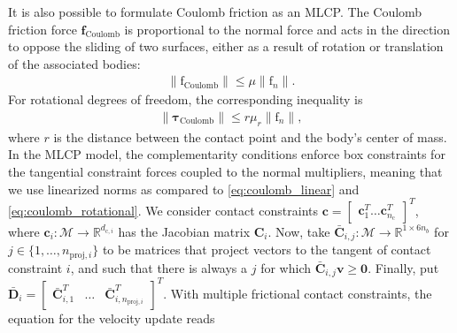 \documentclass[preprint,12pt]{elsarticle}
\let\vec\bm
\let\mat\mathbf
\numberwithin{equation}{section}
\def\tc{\text{c}}
\begin{document}
It is also possible to formulate Coulomb friction as an MLCP.
The Coulomb friction force $\vec{\mathrm{\vec{f}}}_{\text{Coulomb}}$ is proportional to the normal force and acts in the direction to oppose the sliding of two surfaces, either as a result of rotation or translation of the associated bodies:
\begin{align}
\label{eq:coulomb_linear}
    \| \vec{\mathrm{f}}_{\text{Coulomb}}\| \leq \mu\|\vec{\mathrm{f}}_n\|.
\end{align}
For rotational degrees of freedom, the corresponding inequality is
\begin{align}
    \label{eq:coulomb_rotational}
    \| \vec{\tau}_{\text{Coulomb}}\| \leq r \mu_r\|\vec{\mathrm{f}}_n\|,
\end{align}
where $r$ is the distance between the contact point and the body's center of mass.
In the MLCP model, the complementarity conditions enforce box constraints for the tangential constraint forces coupled to the normal multipliers, meaning that we use linearized norms as compared to \eqref{eq:coulomb_linear} and \eqref{eq:coulomb_rotational}.
We consider contact constraints $\vec{c} = \begin{bmatrix} \vec{c}_1^T \hdots \vec{c}_{n_\tc}^T \end{bmatrix}^T$, where $\vec{c}_i: \mathcal{M} \to \mathbb{R}^{d_{\tc, i}}$ has the Jacobian matrix $\mat{C}_i$.
Now, take $\mat{\bar{C}}_{i, j}: \mathcal{M} \to \mathbb{R}^{1 \times 6n_b}$ for $j \in \{1,\hdots,n_{\text{proj}, i}\}$ to be matrices that project vectors to the tangent of contact constraint $i$, and such that there is always a $j$ for which $\mat{\bar{C}}_{i, j}\vec{v} \geq \vec{0}$.
Finally, put $\bar{\mat{D}}_i = \begin{bmatrix} \bar{\mat{C}}_{i, 1}^T & \hdots & \bar{\mat{C}}_{i, n_{\text{proj}, i}}^T\end{bmatrix}^T$. 
With multiple frictional contact constraints, the equation for the velocity update reads
\end{document}
